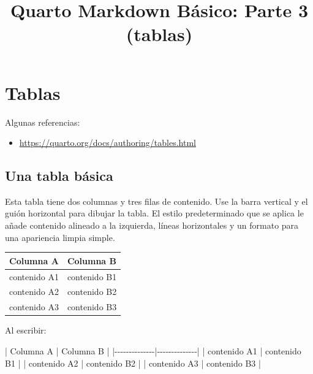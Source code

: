 \documentclass[
  letterpaper,
  DIV=11,
  numbers=noendperiod]{scrartcl}
\title{Quarto Markdown Básico: Parte 3 (tablas)}
\author{}
\date{}
\newenvironment{Shaded}{\begin{snugshade}}{\end{snugshade}}
\newcommand{\NormalTok}[1]{\textcolor[rgb]{0.00,0.23,0.31}{#1}}
\providecommand{\tightlist}{%
  \setlength{\itemsep}{0pt}\setlength{\parskip}{0pt}}\usepackage{longtable,booktabs,array}
\renewcommand*\contentsname{Tabla de contenidos}
\newcommand\contentsname{Tabla de contenidos}
\begin{document}
\maketitle

\renewcommand*\contentsname{Tabla de contenidos}
{
\hypersetup{linkcolor=}
\setcounter{tocdepth}{3}
\tableofcontents
}

\section{Tablas}\label{tablas}

Algunas referencias:

\begin{itemize}
\tightlist
\item
  \url{https://quarto.org/docs/authoring/tables.html}
\end{itemize}

\subsection{Una tabla básica}\label{una-tabla-buxe1sica}

Esta tabla tiene dos columnas y tres filas de contenido. Use la barra
vertical y el guión horizontal para dibujar la tabla. El estilo
predeterminado que se aplica le añade contenido alineado a la izquierda,
líneas horizontales y un formato para una apariencia limpia simple.

\begin{longtable}[]{@{}ll@{}}
\toprule\noalign{}
Columna A & Columna B \\
\midrule\noalign{}
\endhead
\bottomrule\noalign{}
\endlastfoot
contenido A1 & contenido B1 \\
contenido A2 & contenido B2 \\
contenido A3 & contenido B3 \\
\end{longtable}

Al escribir:

\begin{Shaded}
\begin{Highlighting}[]
\NormalTok{| Columna A    | Columna B    |}
\NormalTok{|{-}{-}{-}{-}{-}{-}{-}{-}{-}{-}{-}{-}{-}{-}|{-}{-}{-}{-}{-}{-}{-}{-}{-}{-}{-}{-}{-}{-}|}
\NormalTok{| contenido A1 | contenido B1 |}
\NormalTok{| contenido A2 | contenido B2 |}
\NormalTok{| contenido A3 | contenido B3 |}
\end{Highlighting}
\end{Shaded}
\end{document}
